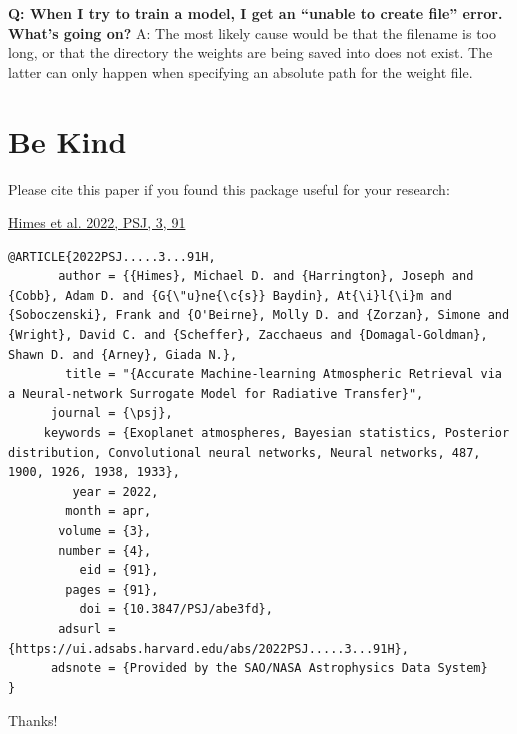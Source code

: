 \documentclass[letterpaper, 12pt]{article}
\begin{document}
\noindent \textbf{Q: When I try to train a model, I get an ``unable to create 
file'' error.  What's going on?}  A: The most likely cause would be that the 
filename is too long, or that the directory the weights are being saved into 
does not exist.  The latter can only happen when specifying an absolute path 
for the weight file. 


\section{Be Kind}
\label{sec:bekind}
Please cite this paper if you found this package useful for your research:

\href{https://iopscience.iop.org/article/10.3847/PSJ/abe3fd/meta}{Himes et al. 2022, PSJ, 3, 91}

\begin{verbatim}
@ARTICLE{2022PSJ.....3...91H,
       author = {{Himes}, Michael D. and {Harrington}, Joseph and {Cobb}, Adam D. and {G{\"u}ne{\c{s}} Baydin}, At{\i}l{\i}m and {Soboczenski}, Frank and {O'Beirne}, Molly D. and {Zorzan}, Simone and {Wright}, David C. and {Scheffer}, Zacchaeus and {Domagal-Goldman}, Shawn D. and {Arney}, Giada N.},
        title = "{Accurate Machine-learning Atmospheric Retrieval via a Neural-network Surrogate Model for Radiative Transfer}",
      journal = {\psj},
     keywords = {Exoplanet atmospheres, Bayesian statistics, Posterior distribution, Convolutional neural networks, Neural networks, 487, 1900, 1926, 1938, 1933},
         year = 2022,
        month = apr,
       volume = {3},
       number = {4},
          eid = {91},
        pages = {91},
          doi = {10.3847/PSJ/abe3fd},
       adsurl = {https://ui.adsabs.harvard.edu/abs/2022PSJ.....3...91H},
      adsnote = {Provided by the SAO/NASA Astrophysics Data System}
}
\end{verbatim}

\noindent Thanks!



\end{document}

